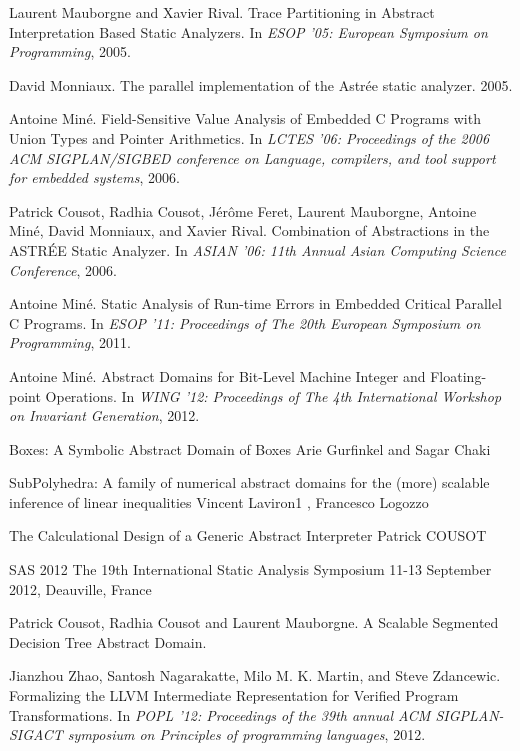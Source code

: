 \documentclass[a4paper]{book}
\begin{document}
\begin{thebibliography}{9}
 Laurent Mauborgne and Xavier Rival.  Trace Partitioning
  in Abstract Interpretation Based Static Analyzers.  In \emph{ESOP
    '05: European Symposium on Programming}, 2005.

 David Monniaux.  The parallel implementation of the
  Astrée static analyzer.  2005.

 Antoine Miné.  Field-Sensitive Value Analysis of
  Embedded C Programs with Union Types and Pointer Arithmetics.  In
  \emph{LCTES '06: Proceedings of the 2006 ACM SIGPLAN/SIGBED
    conference on Language, compilers, and tool support for embedded
    systems}, 2006.

 Patrick Cousot, Radhia Cousot, Jérôme Feret,
  Laurent Mauborgne, Antoine Miné, David Monniaux, and Xavier Rival.
  Combination of Abstractions in the ASTRÉE Static Analyzer. In
  \emph{ASIAN '06: 11th Annual Asian Computing Science Conference},
  2006.

 Antoine Miné.  Static Analysis of Run-time Errors in
  Embedded Critical Parallel C Programs.  In \emph{ESOP '11:
    Proceedings of The 20th European Symposium on Programming}, 2011.

 Antoine Miné.  Abstract Domains for Bit-Level Machine
  Integer and Floating-point Operations.  In \emph{WING '12:
    Proceedings of The 4th International Workshop on Invariant
    Generation}, 2012.

Boxes: A Symbolic Abstract Domain of Boxes
Arie Gurfinkel and Sagar Chaki

SubPolyhedra: A family of numerical abstract domains for
the (more) scalable inference of linear inequalities
Vincent Laviron1 , Francesco Logozzo

The Calculational Design of
a Generic Abstract Interpreter
Patrick COUSOT


SAS 2012
The 19th International Static Analysis Symposium
11-13 September 2012, Deauville, France 

Patrick Cousot, Radhia Cousot and Laurent Mauborgne.
A Scalable Segmented Decision Tree Abstract Domain.

 Jianzhou Zhao, Santosh Nagarakatte, Milo
  M. K. Martin, and Steve Zdancewic.  Formalizing the LLVM
  Intermediate Representation for Verified Program Transformations. In
  \emph{POPL '12: Proceedings of the 39th annual ACM SIGPLAN-SIGACT
    symposium on Principles of programming languages}, 2012.

\end{thebibliography}

\clearpage
{}
\printindex
\end{document}
